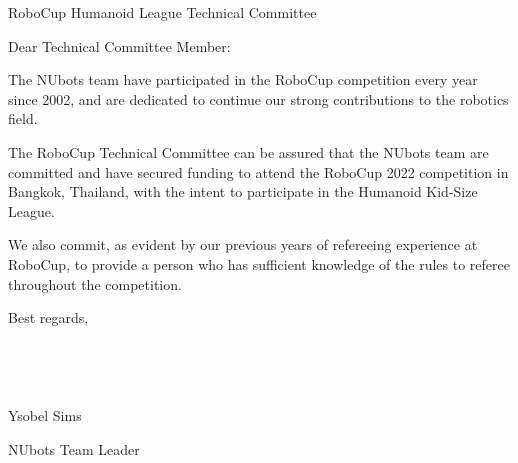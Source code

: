 \documentclass{letter}
\begin{document}
\begin{letter}{RoboCup Humanoid League Technical Committee}
\opening{Dear Technical Committee Member:}

The NUbots team have participated in the RoboCup competition every year since 2002, and are dedicated to continue our strong contributions to the robotics field.

The RoboCup Technical Committee can be assured that the NUbots team are committed and have secured funding to attend the RoboCup 2022 competition in Bangkok, Thailand, with the intent to participate in the Humanoid Kid-Size League.

We also commit, as evident by our previous years of refereeing experience at RoboCup, to provide a person who has sufficient knowledge of the rules to referee throughout the competition.

Best regards, \\ \\ \\ \\ \\ 

\hspace*{20pt} Ysobel Sims

NUbots Team Leader

\end{letter}
\end{document}
